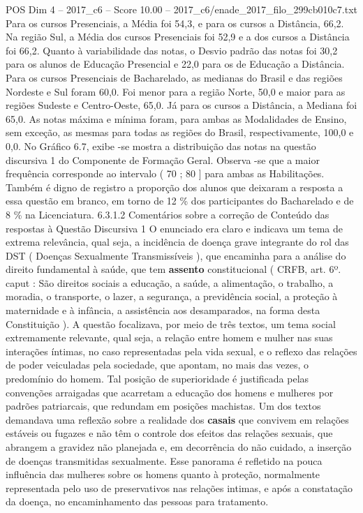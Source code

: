 \begin{textsample}{POS Dim 4 – 2017\_c6 – Score 10.00 – 2017\_c6/enade\_2017\_filo\_299cb010c7.txt}
Para os cursos Presenciais, a Média foi 54,3, e para os cursos a Distância, 66,2.
Na região Sul, a Média dos cursos Presenciais foi 52,9 e a dos cursos a Distância foi 66,2.
Quanto à variabilidade das notas, o Desvio padrão das notas foi 30,2 para os alunos de Educação Presencial e 22,0 para os de Educação a Distância.
Para os cursos Presenciais de Bacharelado, as medianas do Brasil e das regiões Nordeste e Sul foram 60,0.
Foi menor para a região Norte, 50,0 e maior para as regiões Sudeste e Centro-Oeste, 65,0.
Já para os cursos a Distância, a Mediana foi 65,0.
As notas máxima e mínima foram, para ambas as Modalidades de Ensino, sem exceção, as mesmas para todas as regiões do Brasil, respectivamente, 100,0 e 0,0.
No Gráfico 6.7, exibe -se mostra a distribuição das notas na questão discursiva 1 do Componente de Formação Geral.
Observa -se que a maior frequência corresponde ao intervalo ( 70 ; 80 ] para ambas as Habilitações.
Também é digno de registro a proporção dos alunos que deixaram a resposta a essa questão em branco, em torno de 12 \% dos participantes do Bacharelado e de 8 \% na Licenciatura. 6.3.1.2 Comentários sobre a correção de Conteúdo das respostas à Questão Discursiva 1 O enunciado era claro e indicava um tema de extrema relevância, qual seja, a incidência de doença grave integrante do rol das DST ( Doenças Sexualmente Transmissíveis ), que encaminha para a análise do direito fundamental à saúde, que tem \textbf{assento} constitucional ( CRFB, art. 6º. caput : São direitos sociais a educação, a saúde, a alimentação, o trabalho, a moradia, o transporte, o lazer, a segurança, a previdência social, a proteção à maternidade e à infância, a assistência aos desamparados, na forma desta Constituição ).
A questão focalizava, por meio de três textos, um tema social extremamente relevante, qual seja, a relação entre homem e mulher nas suas interações íntimas, no caso representadas pela vida sexual, e o reflexo das relações de poder veiculadas pela sociedade, que apontam, no mais das vezes, o predomínio do homem.
Tal posição de superioridade é justificada pelas convenções arraigadas que acarretam a educação dos homens e mulheres por padrões patriarcais, que redundam em posições machistas.
Um dos textos demandava uma reflexão sobre a realidade dos \textbf{casais} que convivem em relações estáveis ou fugazes e não têm o controle dos efeitos das relações sexuais, que abrangem a gravidez não planejada e, em decorrência do não cuidado, a inserção de doenças transmitidas sexualmente.
Esse panorama é refletido na pouca influência das mulheres sobre os homens quanto à proteção, normalmente representada pelo uso de preservativos nas relações intimas, e após a constatação da doença, no encaminhamento das pessoas para tratamento.

\end{textsample}

